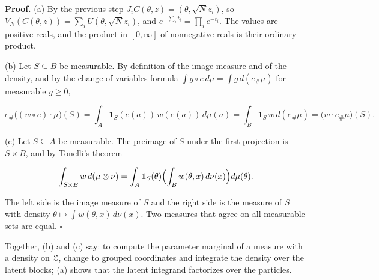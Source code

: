 \documentclass[11pt,a4paper]{article}
\begin{document}
\textbf{Proof.} (a) By the previous step \(J_iC(\theta,z)=(\theta,\sqrt Nz_i)\), so \(V_N(C(\theta,z))=\sum_iU(\theta,\sqrt Nz_i)\), and \(e^{-\sum_it_i}=\prod_ie^{-t_i}\). The values are positive reals, and the product in \([0,\infty]\) of nonnegative reals is their ordinary product.




(b) Let \(S\subseteq B\) be measurable. By definition of the image measure and of the density, and by the change-of-variables formula \(\int g\circ e\,d\mu=\int g\,d(e_\#\mu)\) for measurable \(g\ge0\),


\[e_\#\bigl((w\circ e)\cdot\mu\bigr)(S)=\int_A\mathbf 1_S(e(a))\,w(e(a))\,d\mu(a)=\int_B\mathbf 1_S\,w\,d(e_\#\mu)=\bigl(w\cdot e_\#\mu\bigr)(S).\]


(c) Let \(S\subseteq A\) be measurable. The preimage of \(S\) under the first projection is \(S\times B\), and by Tonelli's theorem


\[\int_{S\times B}w\,d(\mu\otimes\nu)=\int_A\mathbf 1_S(\theta)\Bigl(\int_Bw(\theta,x)\,d\nu(x)\Bigr)d\mu(\theta).\]


The left side is the image measure of \(S\) and the right side is the measure of \(S\) with density \(\theta\mapsto\int w(\theta,x)\,d\nu(x)\). Two measures that agree on all measurable sets are equal. \(\square\)




Together, (b) and (c) say: to compute the parameter marginal of a measure with a density on \(\mathcal Z\), change to grouped coordinates and integrate the density over the latent blocks; (a) shows that the latent integrand factorizes over the particles.
\end{document}
